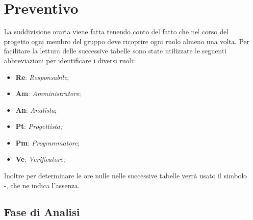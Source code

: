 \section{Preventivo}
La suddivisione oraria viene fatta tenendo conto del fatto che nel corso del progetto ogni  membro del gruppo deve ricoprire ogni ruolo almeno una volta.
Per facilitare la lettura delle successive tabelle sono state utilizzate le seguenti abbreviazioni per identificare i diversi ruoli:
\begin{itemize}
	\item \textbf{Re}: \textit{Responsabile};
	\item \textbf{Am}: \textit{Amministratore};
	\item \textbf{An}: \textit{Analista};
	\item \textbf{Pt}: \textit{Progettista};
	\item \textbf{Pm}: \textit{Programmatore};
	\item \textbf{Ve}: \textit{Verificatore};
\end{itemize}
Inoltre per determinare le ore nulle nelle successive tabelle verrà usato il simbolo -, che ne indica l'assenza.

\subsection{Fase di Analisi}

